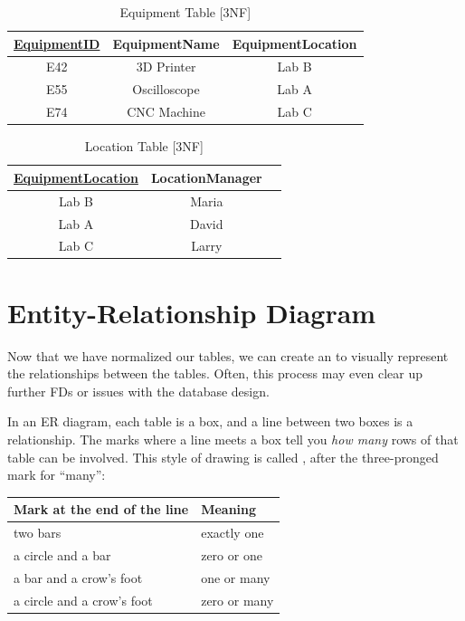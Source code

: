 \begin{table}[H]
\centering
\begin{tabular}{|c|c|c|}
\hline
{\underline{EquipmentID}} & {EquipmentName} & {EquipmentLocation}  \\
\hline
E42 & 3D Printer & Lab B \\
\hline
E55 & Oscilloscope & Lab A \\
\hline
E74 & CNC Machine & Lab C \\
\hline
\end{tabular}
\caption{Equipment Table [3NF]}
\label{tab:equipment_3nf}
\end{table}

\begin{table}[H]
\centering
\begin{tabular}{|c|c|c|}
\hline
{\underline{EquipmentLocation}} & {LocationManager}  \\
\hline
Lab B & Maria \\
\hline
Lab A & David \\
\hline
Lab C & Larry \\
\hline
\end{tabular}
\caption{Location Table [3NF]}
\label{tab:location_3nf}
\end{table}

\section{Entity-Relationship Diagram}
Now that we have normalized our tables, we can create an  to visually represent the relationships between the tables. Often, this process may even clear up further FDs or issues with the database design.

In an ER diagram, each table is a box, and a line between two boxes is a relationship. The marks where a line meets a box tell you \emph{how many} rows of that table can be involved. This style of drawing is called , after the three-pronged mark for ``many'':

\begin{center}
\begin{tabular}{l l}
\textbf{Mark at the end of the line} & \textbf{Meaning} \\
\hline
two bars & exactly one \\
a circle and a bar & zero or one \\
a bar and a crow's foot & one or many \\
a circle and a crow's foot & zero or many \\
\end{tabular}
\end{center}

